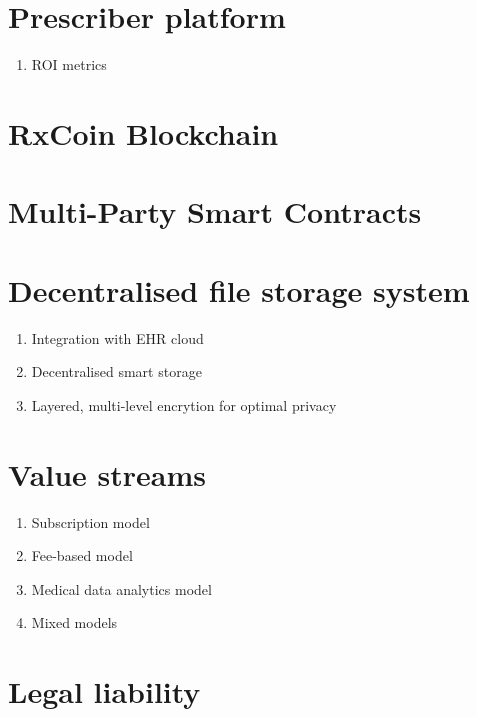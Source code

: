 \documentclass[a4paper,11pt]{article}
\begin{document}
   
\section{Prescriber platform}
   \begin{enumerate}
     \item ROI metrics
   \end{enumerate}
   

\section{RxCoin Blockchain}
  
  
\section{Multi-Party Smart Contracts}
   \begin{enumerate}
   \end{enumerate}
   

\section{Decentralised file storage system}
   \begin{enumerate}
     \item Integration with EHR cloud
     \item Decentralised smart storage
     \item Layered, multi-level encrytion for optimal privacy
   \end{enumerate}
   
  
\section{Value streams}
   \begin{enumerate}
     \item Subscription model
     \item Fee-based model
     \item Medical data analytics model
     \item Mixed models   
   \end{enumerate}
   

\section{Legal liability}
   \begin{enumerate}
   \end{enumerate}
   
\end{document}
